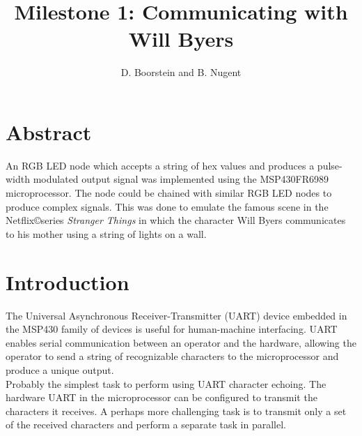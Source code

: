 \documentclass{hitec}
\title{Milestone 1: Communicating with Will Byers}
\author{D. Boorstein and B. Nugent}
\begin{document}
\maketitle
\section{Abstract}

An RGB LED node which accepts a string of hex values and produces a pulse-width modulated output signal was implemented using the MSP430FR6989 microprocessor. The node could be chained with similar RGB LED nodes to produce complex signals. This was done to emulate the famous scene in the Netflix\copyright series \textit{Stranger Things} in which the character Will Byers communicates to his mother using a string of lights on a wall.


\section{Introduction}

The Universal Asynchronous Receiver-Transmitter (UART) device embedded in the MSP430 family of devices is useful for human-machine interfacing. UART enables serial communication between an operator and the hardware, allowing the operator to send a string of recognizable characters to the microprocessor and produce a unique output.\\

\noindent Probably the simplest task to perform using UART character echoing. The hardware UART in the microprocessor can be configured to transmit the characters it receives. A perhaps more challenging task is to transmit only a set of the received characters and perform a separate task in parallel.\\
\end{document}
